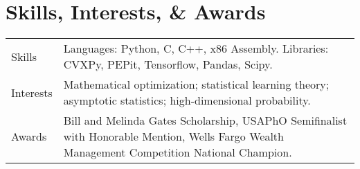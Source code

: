 \documentclass[a4paper,10pt]{article}
\begin{document}

\section{Skills, Interests, \& Awards}
\begin{tabularx}{\linewidth}{@{}l X@{}}
Skills & \normalsize{ Languages: Python, C, C++, x86 Assembly. Libraries: CVXPy, PEPit, Tensorflow, Pandas, Scipy.}\\[2pt]
Interests & \normalsize{Mathematical optimization; statistical learning theory; asymptotic statistics; high-dimensional probability.}\\[2pt]
Awards & \normalsize{Bill and Melinda Gates Scholarship, USAPhO Semifinalist with Honorable Mention, Wells Fargo Wealth Management Competition National Champion.}
\end{tabularx}

\end{document}
